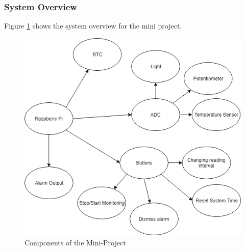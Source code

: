 \subsubsection{System Overview}
Figure \ref{fig:SystemOverview} shows the system overview for the mini project.
\begin{figure}[H]
\centering
\includegraphics[width=0.8\columnwidth]{Figures/SystemOverview}
\caption{Components of the Mini-Project}
\label{fig:SystemOverview}
\end{figure}

